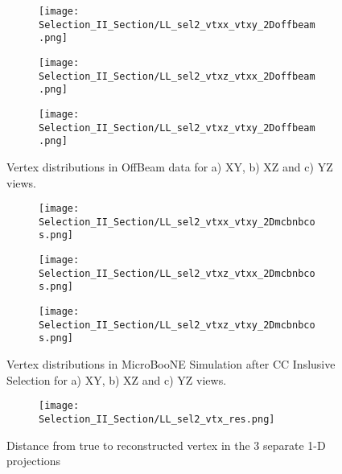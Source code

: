 \begin{figure}[t!]
\centering
  \begin{subfigure}[t]{0.26\textwidth}
    \centering
\texttt{[image: Selection\_II\_Section/LL\_sel2\_vtxx\_vtxy\_2Doffbeam.png]}
    \caption{ }
  \end{subfigure} 
  \hspace{10 mm}
  \begin{subfigure}[t]{0.26\textwidth}
    \centering
\texttt{[image: Selection\_II\_Section/LL\_sel2\_vtxz\_vtxx\_2Doffbeam.png]}
    \caption{ }
  \end{subfigure} 
  \hspace{10 mm}
  \begin{subfigure}[t]{0.26\textwidth}
    \centering
\texttt{[image: Selection\_II\_Section/LL\_sel2\_vtxz\_vtxy\_2Doffbeam.png]}
    \caption{ }
  \end{subfigure} 

\caption{ Vertex distributions in OffBeam data for a) XY, b) XZ and c) YZ views. }
\label{fig:ll_sel2_vertices_offbeam}
\end{figure}

\begin{figure}[h!]
\centering
  \begin{subfigure}[t]{0.26\textwidth}
    \centering
\texttt{[image: Selection\_II\_Section/LL\_sel2\_vtxx\_vtxy\_2Dmcbnbcos.png]}
    \caption{ }
  \end{subfigure} 
  \hspace{10 mm}
  \begin{subfigure}[t]{0.26\textwidth}
    \centering
\texttt{[image: Selection\_II\_Section/LL\_sel2\_vtxz\_vtxx\_2Dmcbnbcos.png]}
    \caption{ }
  \end{subfigure} 
  \hspace{10 mm}
  \begin{subfigure}[t]{0.26\textwidth}
    \centering
\texttt{[image: Selection\_II\_Section/LL\_sel2\_vtxz\_vtxy\_2Dmcbnbcos.png]}
    \caption{ }
  \end{subfigure} 
\caption{ Vertex distributions in MicroBooNE Simulation after CC Inslusive Selection for a) XY, b) XZ and c) YZ views. }
\label{fig:ll_sel2_vertices_mc}
\end{figure}


\begin{figure}[t!]
\centering
 \begin{subfigure}[t]{0.6\textwidth}
    \centering
\texttt{[image: Selection\_II\_Section/LL\_sel2\_vtx\_res.png]}
    \caption{ }
  \end{subfigure} 

\caption{Distance from true to reconstructed vertex in the 3 separate 1-D projections }
\label{fig:physics_sel2_vtxres}
\end{figure}

